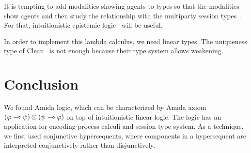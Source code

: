 It is tempting to add modalities showing agents to types so that the
modalities show agents and then study the relationship with the
multiparty session types~\citep{sync-multi-session, async-multi-session}.
For that, intuitionistic epistemic logic~\citet{hirailpar,hiraimaster}
will be useful.

In order to implement this lambda calculus, we need linear types.
The uniqueness type of Clean~ is not enough because
their type system allows weakening.


\section{Conclusion}

We found Amida logic, which can be characterized by Amida axiom
$(\varphi\multimap\psi)\otimes(\psi\multimap\varphi)$ on top of intuitionistic
linear logic.
The logic has an application for encoding process calculi and session type
system.
As a technique, we first used conjunctive hypersequents,
where components in a hypersequent are interpreted conjunctively rather
than disjunctively.